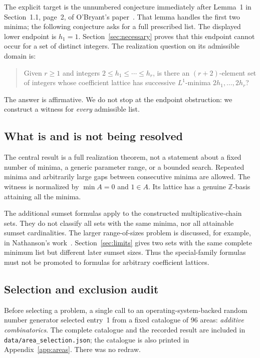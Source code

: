 \documentclass[11pt]{article}
\numberwithin{equation}{section}
\theoremstyle{definition}
\theoremstyle{remark}\newtheorem{remark}[theorem]{Remark}
\newcommand{\Z}{\mathbb Z}\newcommand{\N}{\mathbb N}
\begin{document}
The explicit target is the unnumbered conjecture immediately after Lemma~1
in Section~1.1, page~2, of O'Bryant's paper~\cite{obryant}.  That lemma handles
the first two minima; the following conjecture asks for a full prescribed
list.  The displayed lower endpoint is $h_1=1$.  Section~\ref{sec:necessary}
proves that this endpoint cannot occur for a set of distinct integers.
The realization question on its admissible domain is:
\begin{quote}
Given $r\ge1$ and integers $2\le h_1\le\cdots\le h_r$, is there an
$(r+2)$-element set of integers whose coefficient lattice has successive
$L^1$-minima $2h_1,\ldots,2h_r$?
\end{quote}
The answer is affirmative.  We do not stop at the endpoint obstruction:
we construct a witness for \emph{every} admissible list.

\subsection{What is and is not being resolved}

The central result is a full realization theorem, not a statement about a
fixed number of minima, a generic parameter range, or a bounded search.
Repeated minima and arbitrarily large gaps between consecutive minima are
allowed.  The witness is normalized by $\min A=0$ and $1\in A$.
Its lattice has a genuine $\Z$-basis attaining all the minima.

The additional sumset formulas apply to the constructed multiplicative-chain
sets.  They do not classify all sets with the same minima, nor all attainable
sumset cardinalities.  The larger range-of-sizes problem is discussed, for
example, in Nathanson's work~\cite{nathanson}.  Section~\ref{sec:limits}
gives two sets with the same complete minimum list but different later
sumset sizes.  Thus the special-family formulas must not be promoted to
formulas for arbitrary coefficient lattices.

\subsection{Selection and exclusion audit}

Before selecting a problem, a single call to an operating-system-backed
random number generator selected entry~1 from a fixed catalogue of 96 areas:
\emph{additive combinatorics}.  The complete catalogue and the recorded result
are included in \texttt{data/area\_selection.json}; the catalogue is also
printed in Appendix~\ref{app:areas}.  There was no redraw.
\end{document}
